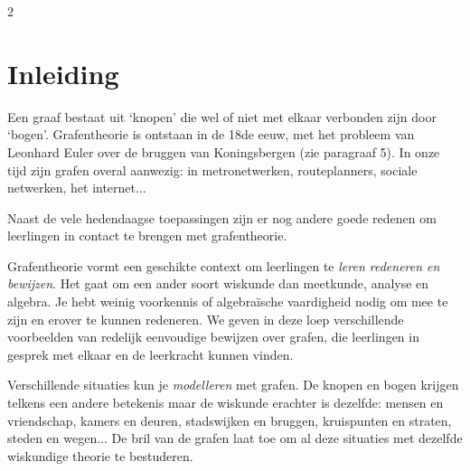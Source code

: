 \begin{multicols}{2}                      
\inhoudstafelLoep		                  %





\section{Inleiding}

Een graaf bestaat uit `knopen' die wel of niet met elkaar verbonden zijn door `bogen'. Grafentheorie is ontstaan in de 18de eeuw, met het probleem van Leonhard Euler over de bruggen van Koningsbergen (zie paragraaf 5). In onze tijd zijn grafen overal aanwezig: in metronetwerken, routeplanners, sociale netwerken, het internet... 

Naast de vele hedendaagse toepassingen zijn er nog andere goede redenen om leerlingen in contact te  brengen met grafentheorie.

\begin{opsomming}
\item Grafentheorie vormt een geschikte context om leerlingen te \emph{leren redeneren en bewijzen}. Het gaat om een ander soort wiskunde dan meetkunde, analyse en algebra. Je hebt weinig voorkennis of algebraïsche vaardigheid nodig om mee te zijn en erover te kunnen redeneren. We geven in deze loep verschillende voorbeelden van redelijk eenvoudige bewijzen over grafen, die leerlingen in gesprek met elkaar en de leerkracht kunnen vinden.

\item Verschillende situaties kun je \emph{modelleren} met grafen. De knopen en bogen krijgen telkens een andere betekenis maar de wiskunde erachter is dezelfde: mensen en vriendschap, kamers en deuren, stadswijken en bruggen, kruispunten en straten, steden en wegen... De bril van de grafen laat toe om al deze situaties met dezelfde wiskundige theorie te bestuderen.


\end{opsomming}
\end{multicols}
